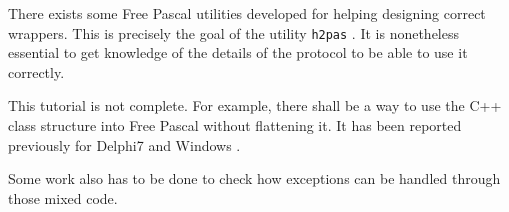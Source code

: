 \documentclass[A4paper]{article}
\begin{document}
There exists some Free Pascal utilities developed for helping designing
correct wrappers. This is precisely the goal of the utility \verb|h2pas|
\cite{FPDoc,FPFor}. It is nonetheless essential to get knowledge of the
details of the protocol to be able to use it correctly.

This tutorial is not complete. For example, there shall be a way to use the
C++ class structure into Free Pascal without flattening it. It has been
reported previously for Delphi7 and Windows \cite{Rudy2006}.

Some work also has to be done to check how exceptions can be handled through
those mixed code.


\end{document}
